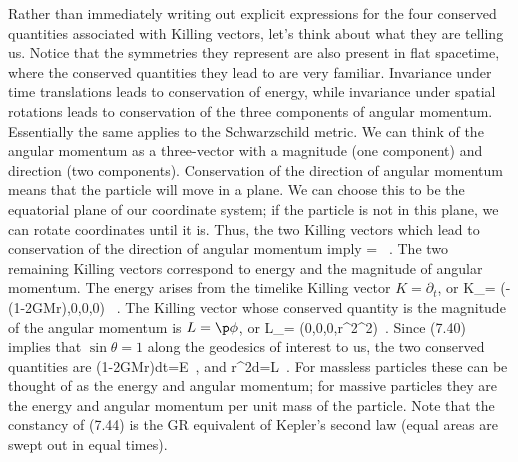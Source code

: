 Rather than immediately writing out explicit expressions for the
four conserved quantities associated with Killing vectors, let's think
about what they are telling us.  Notice that the symmetries they
represent are also present in flat spacetime, where the conserved
quantities they lead to are very familiar.  Invariance under time
translations leads to conservation of energy, while invariance under
spatial rotations leads to conservation of the three components of
angular momentum.  Essentially the same applies to the Schwarzschild
metric.  We can think of the angular momentum as a three-vector with
a magnitude (one component) and direction (two components).  Conservation
of the direction of angular momentum means that the particle will move
in a plane.  We can choose this to be the equatorial plane of our 
coordinate system; if the particle is not in this plane, we can rotate
coordinates until it is.  Thus, the two Killing vectors which lead to
conservation of the direction of angular momentum imply
\be
  \theta = {\pi{}}\ .\label{7.40}
\ee
The two remaining Killing vectors correspond to energy and the
magnitude of angular momentum.  The energy arises from the timelike
Killing vector $K = \partial_t$, or
\be
  K_\mu = \left(-\left(1-{{2GM}\over r}\right),0,0,0\right)
  \ .\label{7.41}
\ee
The Killing vector whose conserved quantity is the magnitude of the
angular momentum is $L = \p\phi$, or
\be
  L_\mu = \left(0,0,0,r^2\sin^2\theta \right)\ .\label{7.42}
\ee
Since (7.40) implies that $\sin\theta = 1$ along the geodesics of
interest to us, the two conserved quantities are
\be
  \left(1-{{2GM}\over r}\right){{dt}}=E\ ,\label{7.43}
\ee
and
\be
  r^2{{d\phi}}=L\ .\label{7.44}
\ee
For massless particles these can be thought of as the energy and 
angular momentum; for massive particles they are the energy and
angular momentum per unit mass of the particle.  Note that the 
constancy of (7.44) is the GR equivalent of Kepler's second law
(equal areas are swept out in equal times).

